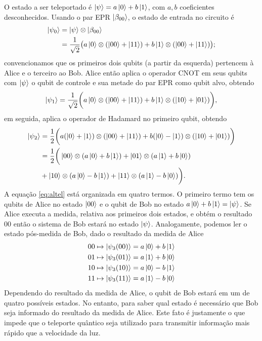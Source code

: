O estado a ser teleportado é $\ket{\psi} = a\ket{0} + b\ket{1}$, com $a,b$ coeficientes desconhecidos. Usando o par EPR $\ket{\beta_{00}}$, o estado de entrada no circuito é
%
\begin{align}
    \ket{\psi_0}    &= \ket{\psi}\otimes\ket{\beta_{00}} \\
                    &= \frac{1}{\sqrt{2}}\big( a\ket{0}\otimes(\ket{00} + \ket{11}) + b\ket{1}\otimes(\ket{00} + \ket{11}) \big);
\end{align}
%
convencionamos que os primeiros dois qubits (a partir da esquerda) pertencem à Alice e o terceiro ao Bob. Alice então aplica o operador \textsf{CNOT} em seus qubits com $\ket{\psi}$ o qubit de controle e sua metade do par EPR como qubit alvo, obtendo
%
\begin{equation}
    \ket{\psi_1} = \frac{1}{\sqrt{2}}\bigg( a\ket{0}\otimes(\ket{00} + \ket{11}) + b\ket{1}\otimes(\ket{10} + \ket{01})\bigg),
\end{equation}
%
em seguida, aplica o operador de Hadamard no primeiro qubit, obtendo
%
\begin{equation}\label{eq:altel}
    \begin{split}
        \ket{\psi_2} &= \frac{1}{2}\bigg( a(\ket{0}+\ket{1})\otimes(\ket{00} + \ket{11}) + b(\ket{0}-\ket{1})\otimes(\ket{10} + \ket{01}) \bigg)\\
                    &= \frac{1}{2} \bigg( \ket{00}\otimes(a\ket{0} + b\ket{1}) + \ket{01}\otimes(a\ket{1} + b\ket{0}) \\
                    &+ \ket{10}\otimes(a\ket{0}-b\ket{1}) + \ket{11}\otimes(a\ket{1}-b\ket{0})\bigg).
    \end{split}
\end{equation}
%
A equação \eqref{eq:altel} está organizada em quatro termos. O primeiro termo tem os qubits de Alice no estado $\ket{00}$ e o qubit de Bob no estado $a\ket{0}+b\ket{1}=\ket{\psi}$. Se Alice executa a medida, relativa aos primeiros dois estados, e obtém o resultado 00 então o sistema de Bob estará no estado $\ket{\psi}$. Analogamente, podemos ler o estado pós-medida de Bob, dado o resultado da medida de Alice
\begin{align}
    00 \mapsto \ket{\psi_3(00)} = a\ket{0} + b\ket{1} \\
    01 \mapsto \ket{\psi_3(01)} = a\ket{1} + b\ket{0} \\
    10 \mapsto \ket{\psi_3(10)} = a\ket{0} - b\ket{1} \\
    11 \mapsto \ket{\psi_3(11)} = a\ket{1} - b\ket{0}
\end{align}
Dependendo do resultado da medida de Alice, o qubit de Bob estará em um de quatro possíveis estados. No entanto, para saber qual estado é necessário que Bob seja informado do resultado da medida de Alice. Este fato é justamente o que impede que o teleporte quântico seja utilizado para transmitir informação mais rápido que a velocidade da luz.

